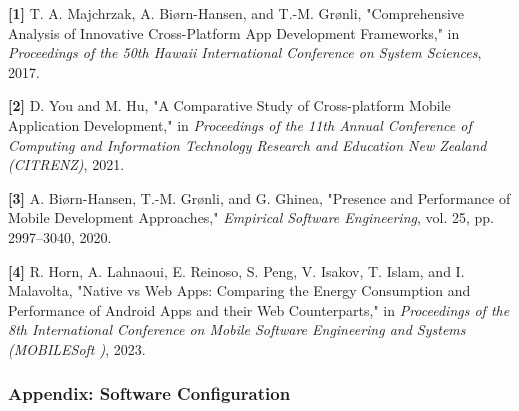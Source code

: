 \documentclass[
]{article}
\begin{document}
\textbf{{[}1{]}} T. A. Majchrzak, A. Biørn-Hansen, and T.-M. Grønli,
"Comprehensive Analysis of Innovative Cross-Platform App Development
Frameworks," in \emph{Proceedings of the 50th Hawaii International
Conference on System Sciences}, 2017.

\textbf{{[}2{]}} D. You and M. Hu, "A Comparative Study of
Cross-platform Mobile Application Development," in \emph{Proceedings of
the 11th Annual Conference of Computing and Information Technology
Research and Education New Zealand (CITRENZ)}, 2021.

\textbf{{[}3{]}} A. Biørn-Hansen, T.-M. Grønli, and G. Ghinea, "Presence
and Performance of Mobile Development Approaches," \emph{Empirical
Software Engineering}, vol. 25, pp. 2997--3040, 2020.

\textbf{{[}4{]}} R. Horn, A. Lahnaoui, E. Reinoso, S. Peng, V. Isakov,
T. Islam, and I. Malavolta, "Native vs Web Apps: Comparing the Energy
Consumption and Performance of Android Apps and their Web Counterparts,"
in \emph{Proceedings of the 8th International Conference on Mobile
Software Engineering and Systems (MOBILESoft )}, 2023.

\subsubsection{\texorpdfstring{\textbf{Appendix: Software
Configuration}}{Appendix: Software Configuration}}\label{appendix-software-configuration}
\end{document}
